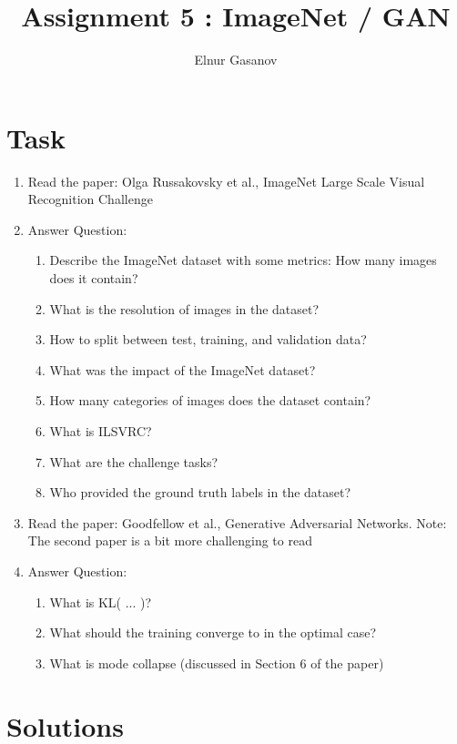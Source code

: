 \documentclass{article}
\author{Elnur Gasanov}
\title{Assignment 5 : ImageNet / GAN}
\date{}
\begin{document}
\maketitle

\section{Task}

\begin{enumerate}
	\item Read the paper: Olga Russakovsky et al., ImageNet Large Scale Visual Recognition Challenge
	\item Answer Question: \begin{enumerate} \item Describe the ImageNet dataset with some metrics: How many images does it contain? \item  What is the resolution of images in the dataset? \item How to split between test, training, and validation data? \item What was the impact of the ImageNet dataset? \item How many categories of images does the dataset contain? \item What is ILSVRC? \item What are the challenge tasks? \item Who provided the ground truth labels in the dataset? \end{enumerate} 
	\item Read the paper: Goodfellow et al., Generative Adversarial Networks. Note: The second paper is a bit more challenging to read
	\item Answer Question: \begin{enumerate} \item What is KL( ... )? \item What should the training converge to in the optimal case? \item What is mode collapse (discussed in Section 6 of the paper) \end{enumerate} 
\end{enumerate}

\section{Solutions}
\end{document}
